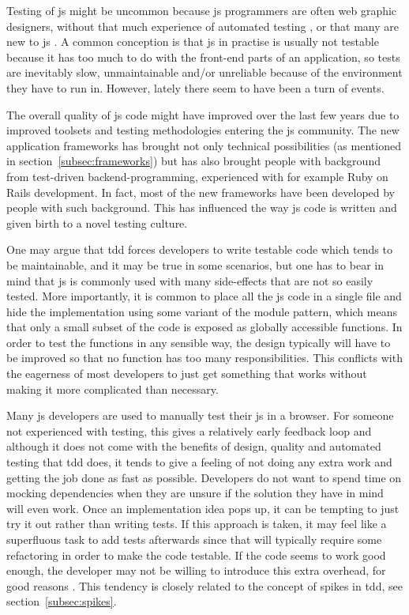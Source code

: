 \documentclass[11pt]{article}
\begin{document}
Testing of \gls{js} might be uncommon because \gls{js} programmers are often web graphic designers, without that much experience of automated testing \cite[question~10]{Stenmark}, or that many are new to \gls{js} \cite[question~16]{Ekelof}. A common conception is that \gls{js} in practise is usually not testable because it has too much to do with the front-end parts of an application, so tests are inevitably slow, unmaintainable and/or unreliable because of the environment they have to run in. However, lately there seem to have been a turn of events.

The overall quality of \gls{js} code might have improved over the last few years due to improved toolsets and testing methodologies entering the \gls{js} community. The new application frameworks has brought not only technical possibilities (as mentioned in section~\ref{subsec:frameworks}) but has also brought people with background from test-driven backend-programming, experienced with for example Ruby on Rails development. In fact, most of the new frameworks have been developed by people with such background. This has influenced the way \gls{js} code is written and given birth to a novel testing culture. \cite[questions~12-15]{Ahnve}

One may argue that \gls{tdd} forces developers to write testable code which tends to be maintainable, and it may be true in some scenarios, but one has to bear in mind that \gls{js} is commonly used with many side-effects that are not so easily tested. More importantly, it is common to place all the \gls{js} code in a single file and hide the implementation using some variant of the module pattern\cite[p.~40]{GoodParts}, which means that only a small subset of the code is exposed as globally accessible functions. In order to test the functions in any sensible way, the design typically will have to be improved so that no function has too many responsibilities. This conflicts with the eagerness of most developers to just get something that works without making it more complicated than necessary.

Many \gls{js} developers are used to manually test their \gls{js} in a browser. For someone not experienced with testing, this gives a relatively early feedback loop and although it does not come with the benefits of design, quality and automated testing that \gls{tdd} does, it tends to give a feeling of not doing any extra work and getting the job done as fast as possible. Developers do not want to spend time on mocking dependencies when they are unsure if the solution they have in mind will even work. Once an implementation idea pops up, it can be tempting to just try it out rather than writing tests. If this approach is taken, it may feel like a superfluous task to add tests afterwards since that will typically require some refactoring in order to make the code testable. If the code seems to work good enough, the developer may not be willing to introduce this extra overhead, for good reasons \cite[question~43]{Stenmark}. This tendency is closely related to the concept of spikes in \gls{tdd}, see section~\ref{subsec:spikes}.
\end{document}

